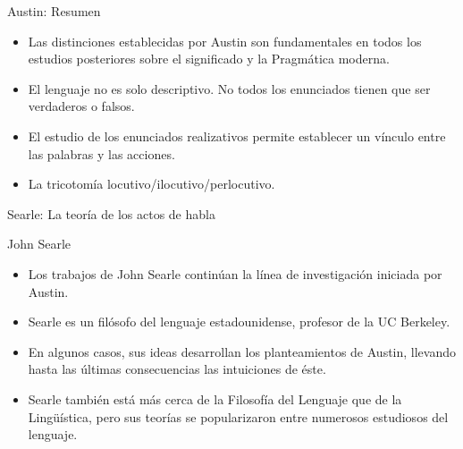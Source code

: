\documentclass{beamer}
\begin{document}
\begin{frame}{Austin: Resumen}

	\begin{itemize}
		\item Las distinciones establecidas por Austin son fundamentales en todos los estudios posteriores sobre el significado y la Pragmática moderna.
		\item El lenguaje no es solo descriptivo. No todos los enunciados tienen que ser verdaderos o falsos.
		\item El estudio de los enunciados realizativos permite establecer un vínculo entre las palabras y las acciones. 
		\item La tricotomía locutivo/ilocutivo/perlocutivo.
	\end{itemize}

\end{frame}


\begin{frame}{}
\begin{center}
  \LARGE{Searle: La teoría de los actos de habla}
\end{center} 
\end{frame}

\begin{frame}{John Searle}

\begin{itemize}
	\item Los trabajos de John Searle continúan la línea de investigación iniciada por Austin.
	\item Searle es un filósofo del lenguaje estadounidense, profesor de la UC Berkeley.
	\item En algunos casos, sus ideas desarrollan los planteamientos de Austin, llevando hasta las últimas consecuencias las intuiciones de éste.
	\item Searle también está más cerca de la Filosofía del Lenguaje que de la Lingüística, pero sus teorías se popularizaron entre numerosos estudiosos del lenguaje.
\end{itemize}

\end{frame}
\end{document}
